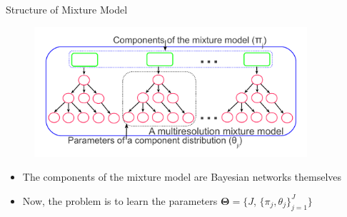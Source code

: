 \documentclass[first=dgreen,second=purple,logo=redexc]{aaltoslides}
\newcommand\FrameText[1]{%
  \begin{textblock*}{0.98\textwidth}(0.2\textwidth,0.95\textheight)
    \textcolor {blue}{\scriptsize\raggedright #1\hspace{0.1\textwidth}}
  \end{textblock*}}
\begin{document}
% 
%       
%       
% 
% 
% 



\begin{frame} {Structure of Mixture Model} 

      \begin{figure}
      \centering
      \includegraphics[trim=1cm 1.5cm 1cm 1cm, clip=true, width=0.9\textwidth]{figures/mixtrees}
      \end{figure}
      
      \begin{itemize}\setlength{\itemsep}{1mm}
      
\small
\item The components of the mixture model are Bayesian networks themselves 
\item Now, the problem is to learn the parameters $ \boldsymbol{\Theta}=\{J$, $\{ \pi_j,\theta_j\}_{j=1}^{J}\}$
\end{itemize}


\end{frame}
\end{document}
